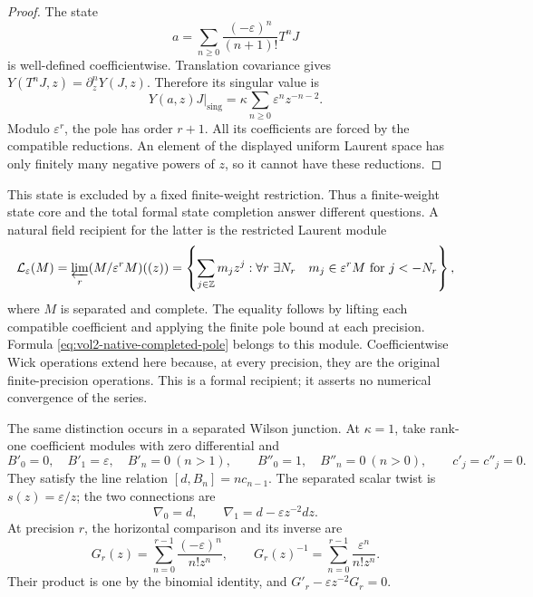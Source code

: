 \begin{proof}
The state
\[
 a=\sum_{n\geq0}\frac{(-\varepsilon)^n}{(n+1)!}T^nJ
\]
is well-defined coefficientwise. Translation covariance gives
\(Y(T^nJ,z)=\partial_z^nY(J,z)\). Therefore its singular value is
\begin{equation}\label{eq:vol2-native-completed-pole}
             Y(a,z)J\big|_{\mathrm{sing}}
                =\kappa\sum_{n\geq0}\varepsilon^nz^{-n-2}.
\end{equation}
Modulo \(\varepsilon^r\), the pole has order \(r+1\).
All its coefficients are forced by the compatible reductions. An element
of the displayed uniform Laurent space has only finitely many negative
powers of \(z\), so it cannot have these reductions.
\end{proof}

This state is excluded by a fixed finite-weight restriction. Thus a
finite-weight state core and the total formal state completion answer
different questions. A natural field recipient for the latter is the
restricted Laurent module
\begin{equation}\label{eq:vol2-native-restricted-laurent}
 \mathcal L_\varepsilon(M)
 =\varprojlim_r(M/\varepsilon^rM)((z))
 =\left\{\sum_{j\in\mathbb Z}m_jz^j:
   \forall r\ \exists N_r\quad
   m_j\in\varepsilon^rM\text{ for }j<-N_r\right\},
\end{equation}
where \(M\) is separated and complete. The equality follows by lifting
each compatible coefficient and applying the finite pole bound at each
precision. Formula \eqref{eq:vol2-native-completed-pole} belongs to this
module. Coefficientwise Wick operations extend here because, at every
precision, they are the original finite-precision operations. This is a
formal recipient; it asserts no numerical convergence of the series.

The same distinction occurs in a separated Wilson junction. At
\(\kappa=1\), take rank-one coefficient modules with zero differential
and
\[
 B'_0=0,\quad B'_1=\varepsilon,\quad B'_n=0\ (n>1),
 \qquad B''_0=1,\quad B''_n=0\ (n>0),\qquad c'_j=c''_j=0.
\]
They satisfy the line relation \([d,B_n]=nc_{n-1}\).
The separated scalar twist is \(s(z)=\varepsilon/z\); the two
connections are
\[
                 \nabla_0=d,\qquad
                 \nabla_1=d-\varepsilon z^{-2}dz.
\]
At precision \(r\), the horizontal comparison and its inverse are
\begin{equation}\label{eq:vol2-native-formal-gauge}
 G_r(z)=\sum_{n=0}^{r-1}\frac{(-\varepsilon)^n}{n!z^n},
 \qquad G_r(z)^{-1}=\sum_{n=0}^{r-1}\frac{\varepsilon^n}{n!z^n}.
\end{equation}
Their product is one by the binomial identity, and
\(G'_r-\varepsilon z^{-2}G_r=0\).


